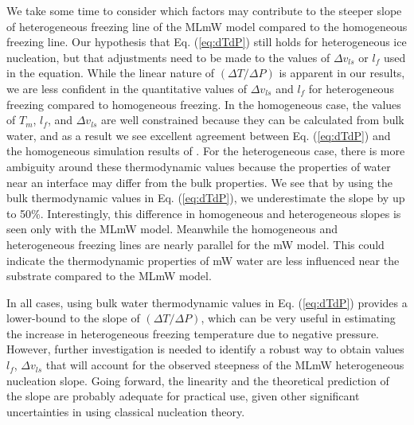\documentclass[journal abbreviation, manuscript]{copernicus}
\begin{document}
We take some time to consider which factors may contribute to the steeper slope of heterogeneous freezing line of the MLmW model compared to the homogeneous freezing line. Our hypothesis that Eq. (\ref{eq:dTdP}) still holds for heterogeneous ice nucleation, but that adjustments need to be made to the values of $\Delta v_{ls}$ or $l_f$ used in the equation. While the linear nature of $(\Delta T/\Delta P)$ is apparent in our results, we are less confident in the quantitative values of $\Delta v_{ls}$ and $l_f$ for heterogeneous freezing compared to homogeneous freezing. In the homogeneous case, the values of $T_m$, $l_f$, and $\Delta v_{ls}$ are well constrained because they can be calculated from bulk water, and as a result we see excellent agreement between Eq. (\ref{eq:dTdP}) and the homogeneous simulation results of \citet{rosky2022}. For the heterogeneous case, there is more ambiguity around these thermodynamic values because the properties of water near an interface may differ from the bulk properties. We see that by using the bulk thermodynamic values in Eq. (\ref{eq:dTdP}), we underestimate the slope by up to 50\%. Interestingly, this difference in homogeneous and heterogeneous slopes is seen only with the MLmW model. Meanwhile the homogeneous and heterogeneous freezing lines are nearly parallel for the mW model. This could indicate the thermodynamic properties of mW water are less influenced near the substrate compared to the MLmW model. 

In all cases, using bulk water thermodynamic values in Eq. (\ref{eq:dTdP}) provides a lower-bound to the slope of $(\Delta T/\Delta P)$, which can be very useful in estimating the increase in heterogeneous freezing temperature due to negative pressure. However, further investigation is needed to identify a robust way to obtain values $l_f$, $\Delta v_{ls}$ that will account for the observed steepness of the MLmW heterogeneous nucleation slope. Going forward, the linearity and the theoretical prediction of the slope are probably adequate for practical use, given other significant uncertainties in using classical nucleation theory. 
\end{document}
